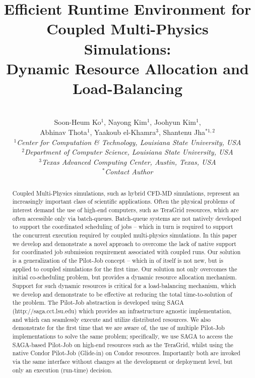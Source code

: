 \documentclass[conference,final]{IEEEtran}
\title{Efficient Runtime Environment for Coupled Multi-Physics Simulations: \\
Dynamic Resource Allocation and Load-Balancing}
\author{
 ~\\[-2em]
 Soon-Heum Ko$^{1}$, Nayong Kim$^{1}$, Joohyun Kim$^{1}$, \\ Abhinav Thota$^{1}$, Yaakoub el-Khamra$^{3}$, Shantenu Jha$^{*1,2}$\\
 \small{\emph{$^{1}$Center for Computation \& Technology, Louisiana State University, USA}}\\
 \small{\emph{$^{2}$Department of Computer Science, Louisiana State University, USA}}\\
 \small{\emph{$^{3}$Texas Advanced Computing Center, Austin, Texas, USA}}\\
 \small{\emph{$^{*}$Contact Author}}\\
}
\newcommand{\up}{\vspace*{-1em}}
\begin{document}
\maketitle

\begin{abstract}
 Coupled Multi-Physics simulations, such as hybrid CFD-MD simulations,
represent an increasingly important class of scientific applications.
Often the physical problems of interest demand the use of high-end
computers, such as TeraGrid resources, which are often accessible only
via batch-queues. Batch-queue systems are not natively developed to
support the coordinated scheduling of jobs -- which in turn is
required to support the concurrent execution required by coupled
multi-physics simulations. In this paper we develop and demonstrate a
novel approach to overcome the lack of native support for coordinated
job submission requirement associated with coupled runs. Our solution
is a generalization of the Pilot-Job concept -- which in of itself is
not new, but is applied to coupled simulations for the first time. Our
solution not only overcomes the initial co-scheduling problem, but
provides a dynamic resource allocation mechanism. Support for such
dynamic resources is critical for a load-balancing mechanism, which we
develop and demonstrate to be effective at reducing the total
time-to-solution of the problem. The Pilot-Job abstraction is
developed using SAGA (http://saga.cct.lsu.edu) which provides an
infrastructure agnostic implementation, and which can seamlessly
execute and utilize distributed resources. We also demonstrate for the
first time that we are aware of, the use of multiple Pilot-Job
implementations to solve the same problem; specifically, we use SAGA
to access the SAGA-based Pilot-Job on high-end resources such as the
TeraGrid, whilst using the native Condor Pilot-Job (Glide-in) on
Condor resources. Importantly both are invoked via the same interface
without changes at the development or deployment level, but only an
execution (run-time) decision.

\end{abstract}
\up\up
\end{document}
